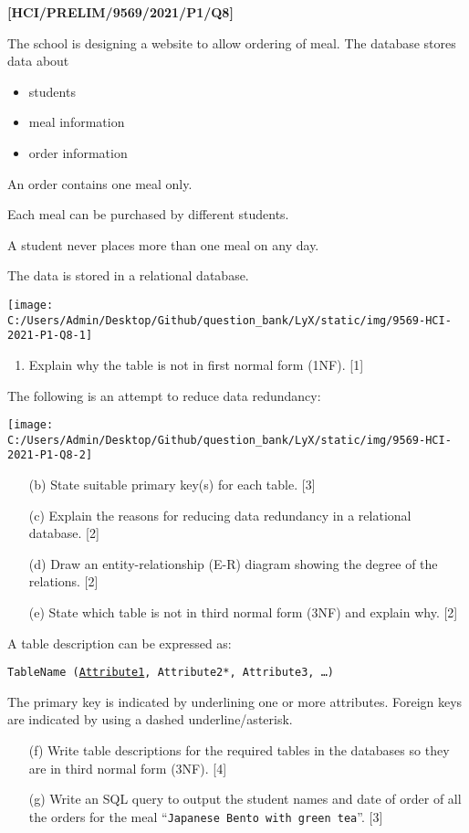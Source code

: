 \item \textbf{{[}HCI/PRELIM/9569/2021/P1/Q8{]}}

The school is designing a website to allow ordering of meal. The database
stores data about 
\begin{itemize}
\item students 
\item meal information
\item order information 
\end{itemize}
An order contains one meal only. 

Each meal can be purchased by different students. 

A student never places more than one meal on any day. 

The data is stored in a relational database. 
\begin{center}
\texttt{[image: C:/Users/Admin/Desktop/Github/question\_bank/LyX/static/img/9569-HCI-2021-P1-Q8-1]}
\par\end{center}
\begin{enumerate}
\item Explain why the table is not in first normal form (1NF). \hfill{}{[}1{]}
\end{enumerate}
The following is an attempt to reduce data redundancy:
\begin{center}
\texttt{[image: C:/Users/Admin/Desktop/Github/question\_bank/LyX/static/img/9569-HCI-2021-P1-Q8-2]}
\par\end{center}
\begin{enumerate}
\item[(b)]  State suitable primary key(s) for each table.\hfill{} {[}3{]}
\item[(c)]  Explain the reasons for reducing data redundancy in a relational
database. \hfill{}{[}2{]}
\item[(d)]  Draw an entity-relationship (E-R) diagram showing the degree of
the relations. \hfill{}{[}2{]}
\item[(e)]  State which table is not in third normal form (3NF) and explain
why. {[}2{]} 
\end{enumerate}
A table description can be expressed as: 
\noindent \begin{center}
\texttt{TableName (}\texttt{\uline{Attribute1}}\texttt{, Attribute2{*},
Attribute3, \dots ) }
\par\end{center}

The primary key is indicated by underlining one or more attributes.
Foreign keys are indicated by using a dashed underline/asterisk.
\begin{enumerate}
\item[(f)]  Write table descriptions for the required tables in the databases
so they are in third normal form (3NF). \hfill{}{[}4{]}
\item[(g)]  Write an SQL query to output the student names and date of order
of all the orders for the meal \textquotedblleft \texttt{Japanese
Bento with green tea}\textquotedblright .\hfill{} {[}3{]}
\end{enumerate}